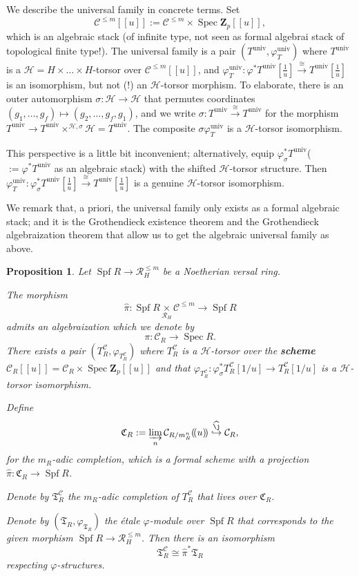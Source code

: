 \documentclass[11pt]{amsart}
\newtheorem{prop}{Proposition}
\numberwithin{thm}{section}
\numberwithin{lem}{section}
\numberwithin{cor}{section}
\numberwithin{prop}{section}
\numberwithin{exam}{section}
\numberwithin{dfn}{section}
\newcommand{\wh}[1]{\widehat{#1}}
\newcommand{\univ}{{\operatorname{univ}}}
\newcommand{\spf}{\operatorname{Spf}}
\newcommand{\spec}{\operatorname{Spec}}
\newcommand{\cC}{\mathcal{C}}
\newcommand{\fC}{\mathfrak{C}}
\newcommand{\fT}{\mathfrak{T}}
\newcommand{\clR}{\mathcal{R}}
\newcommand{\clH}{\mathcal{H}}
\newcommand{\Z}{\mathbf{Z}}
\begin{document}
We describe the universal family in concrete terms.
Set
\[
\cC^{\le m}[\![ u]\!]
:= 
\cC^{\le m}\times \spec \Z_p[\![u]\!],
\]
which is an algebraic stack
(of infinite type, not seen as formal algebrai stack
of topological finite type!).
The universal family
is a pair $(T^\univ, \varphi_T^\univ)$
where $T^\univ$
is a $\clH=H \times \dots\times H$-torsor
over $\cC^{\le m}[\![ u]\!]$,
and
$\varphi_T^\univ:
\varphi^*T^\univ[\frac{1}{u}] \xrightarrow{\cong}T^\univ
[\frac{1}{u}]$
is an isomorphism,
but not (!) an $\clH$-torsor morphism.
To elaborate,
there is an outer automorphism
$\sigma: \clH \to \clH$
that permutes coordinates
$(g_1, \dots, g_f)\mapsto (g_2, \dots, g_f, g_1)$,
and we
write $\sigma: T^\univ\xrightarrow{\cong} T^\univ$
for the morphism
$T^{\univ}\to T^{\univ}\times^{\clH, \sigma}\clH
=T^\univ$.
The composite $\sigma \varphi_T^\univ$
is a $\clH$-torsor isomorphism.

This perspective is a little bit
inconvenient;
alternatively,
equip
$\varphi_\sigma^*T^\univ$($:=
\varphi^*T^\univ$
as an algebraic stack)
with the shifted $\clH$-torsor structure.
Then
$\varphi_T^\univ:
\varphi^*_\sigma T^\univ[\frac{1}{u}] \xrightarrow{\cong}T^\univ
[\frac{1}{u}]$
is a genuine $\clH$-torsor isomorphism.

We remark that, a priori,
the universal family only
exists
as a formal algebraic stack;
and it is the Grothendieck existence theorem
and the Grothendieck algebraization theorem
that allow us to get the algebraic
universal family as above.

\begin{prop}
Let $\spf R\to \clR_{H}^{\le m}$
be a Noetherian versal ring.

The morphism
\[
\widehat{\pi}:\spf R\underset{\clR_{H}}{\times}
\cC^{\le m}
\to \spf R
\]
admits an algebraization
which we denote by
\[
\pi:\cC_R
\to \spec R.
\]
There exists a pair
$(T_R^\cC, \varphi_{T_R^\cC})$
where $T_R^\cC$
is a $\clH$-torsor
over the {\bf scheme}
$\cC_R[\![u]\!]
= \cC_R\times \spec \Z_p[\![u]\!]$
and that
$\varphi_{T_R^\cC}:\varphi^*_\sigma T_R^\cC[1/u]\to T_R^\cC[1/u]$
is a $\clH$-torsor isomorphism.


Define
\[
\fC_R:=\varinjlim_n \cC_{R/m_R^n}(\!(u)\!)
\overset{\wh \j}{\hookrightarrow} \cC_R
,
\]
for the $m_R$-adic completion,
which is a formal scheme
with a projection
$\wh \pi:\fC_R\to\spf R$.

Denote by
$\fT_R^\cC$
the $m_R$-adic completion
of $T_R^\cC$
that lives over $\fC_R$.


Denote by $(\fT_R, \varphi_{\fT_R})$
the \'etale $\varphi$-module
over $\spf R$
that corresponds to the
given morphism $\spf R\to \clR_{H}^{\le m}$.
Then there is an isomorphism
\[
\fT_R^\cC \cong \wh\pi^* \fT_R
\]
respecting $\varphi$-structures.
\label{prop:CR}
\end{prop}
\end{document}
